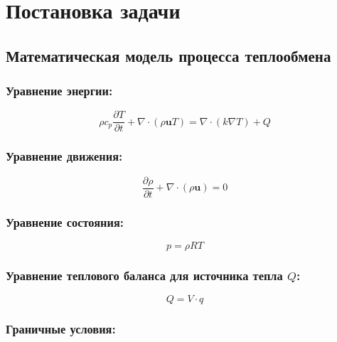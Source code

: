 \documentclass[a4paper,12pt]{extreport}
\numberwithin{equation}{chapter}
\begin{document}
\chapter{Постановка задачи}
\section{Математическая модель процесса теплообмена}

\subsection{Уравнение энергии:}

\begin{equation}
	\rho c_p \frac{\partial T}{\partial t} + \nabla \cdot (\rho \mathbf{u} T) = \nabla \cdot (k \nabla T) + Q
\end{equation}

\subsection*{Уравнение движения:}

\begin{equation}
	\frac{\partial \rho}{\partial t} + \nabla \cdot (\rho \mathbf{u}) = 0
\end{equation}

\subsection{Уравнение состояния:}

\begin{equation}
	p = \rho R T
\end{equation}

\subsection*{Уравнение теплового баланса для источника тепла $Q$:}

\begin{equation}
	Q = V \cdot q
\end{equation}

\subsection{Граничные условия:}
\end{document}
